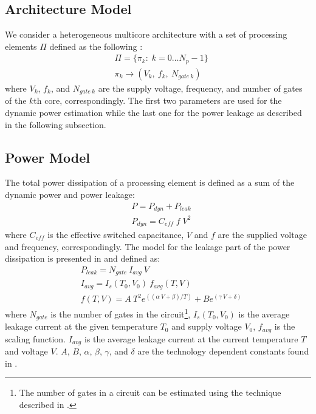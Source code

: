 \subsection{Architecture Model}
We consider a heterogeneous multicore architecture with a set of processing elements $\Pi$ defined as the following \cite{liao2005}:
\begin{align*}
  & \Pi = \{ \pi_k: \; k = 0 \dots N_p - 1 \} \\
  & \pi_k \rightarrow (V_k, \: f_k, \: N_{gate \: k})
\end{align*}
where $V_k$, $f_k$, and $N_{gate \: k}$ are the supply voltage, frequency, and number of gates of the $k$th core, correspondingly. The first two parameters are used for the dynamic power estimation while the last one for the power leakage as described in the following subsection.

\subsection{Power Model}
The total power dissipation of a processing element is defined as a sum of the dynamic power and power leakage:
\begin{align*}
  & P = P_{dyn} + P_{leak} \\
  & P_{dyn} = C_{eff} \; f \; V^2
\end{align*}
where $C_{eff}$ is the effective switched capacitance, $V$ and $f$ are the supplied voltage and frequency, correspondingly. The model for the leakage part of the power dissipation is presented in \cite{liao2005} and defined as:
\begin{align*}
  & P_{leak} = N_{gate} \: I_{avg} \: V \\
  & I_{avg} = I_s(T_0, V_0) \: f_{avg}(T, V) \\
  & f(T, V) = A \: T^2 e^{((\alpha \: V + \beta)/T)} + B e^{(\gamma \: V + \delta)}
\end{align*}
where $N_{gate}$ is the number of gates in the circuit\footnote{The number of gates in a circuit can be estimated using the technique described in \cite{li2004}.}, $I_s (T_0, V_0)$ is the average leakage current at the given temperature $T_0$ and supply voltage $V_0$, $f_{avg}$ is the scaling function. $I_{avg}$ is the average leakage current at the current temperature $T$ and voltage $V$. $A$, $B$, $\alpha$, $\beta$, $\gamma$, and $\delta$ are the technology dependent constants found in \cite{liao2005}.

